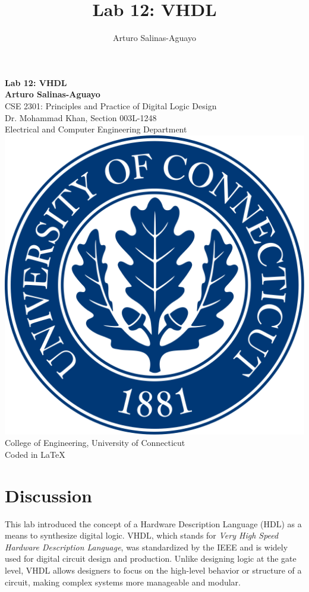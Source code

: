 \documentclass[12pt]{article}
\author{Arturo Salinas-Aguayo}
\title{Lab 12: VHDL}
\begin{document}
\newcommand{\closure}[2][3]{%
	{}\mkern#1mu\overline{\mkern-#1mu#2}}
\newcommand\ncoverline[1]{\mkern1mu\overline{\mkern-1mu#1\mkern-1mu}\mkern1mu}
\begin{titlepage}
	\centering
	\vspace*{3cm}
	\huge\textbf{Lab 12: VHDL}\\
	\vspace{5cm}
	\Large\textbf{Arturo Salinas-Aguayo}\\
	\normalsize
	CSE 2301: Principles and Practice of Digital Logic Design\\
	Dr. Mohammad Khan, Section 003L-1248\\
	Electrical and Computer Engineering Department
	\vfill
	\includegraphics[scale=0.1]{uconnlogo}\\
	College of Engineering, University of Connecticut\\
	\scriptsize{Coded in \LaTeX}
	\vspace*{1cm}
\end{titlepage}
\section*{Discussion}
This lab introduced the concept of a Hardware Description Language (HDL) as a
means to synthesize digital logic. VHDL, which stands for \textit{Very High
	Speed Hardware Description Language}, was standardized by the IEEE and is widely
used for digital circuit design and production. Unlike designing logic at the
gate level, VHDL allows designers to focus on the high-level behavior or
structure of a circuit, making complex systems more manageable and modular.
\end{document}
